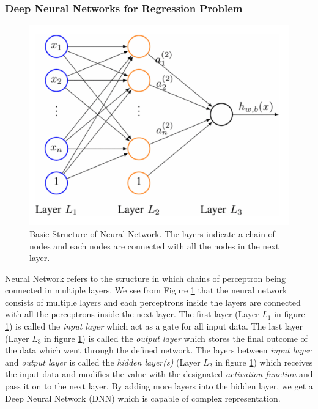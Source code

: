 \subsubsection{Deep Neural Networks for Regression Problem}
\begin{figure}[ht]
    \centering
    \includegraphics[width=12cm]{images/Neural_Network.png}
    \caption{Basic Structure of Neural Network\citep{NNStructure}. The layers indicate a chain of nodes and each nodes are connected with all the nodes in the next layer. }
    \label{fig:Neural_Network}
\end{figure}
Neural Network refers to the structure in which chains of perceptron being connected in multiple layers. We see from Figure \ref{fig:Neural_Network} that the neural network consists of multiple layers and each perceptrons inside the layers are connected with all the perceptrons inside the next layer. The first layer (Layer $L_{1}$ in figure \ref{fig:Neural_Network}) is called the \textit{input layer} which act as a gate for all input data. The last layer (Layer $L_{3}$ in figure \ref{fig:Neural_Network}) is called the \textit{output layer} which stores the final outcome of the data which went through the defined network. The layers between \textit{input layer} and \textit{output layer} is called the \textit{hidden layer(s)} (Layer $L_{2}$ in figure \ref{fig:Neural_Network}) which receives the input data and modifies the value with the designated \textit{activation function} and pass it on to the next layer. By adding more layers into the hidden layer, we get a Deep Neural Network (DNN) which is capable of complex representation. 

